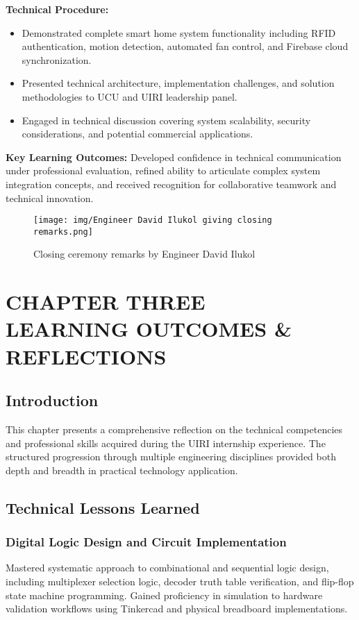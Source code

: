 \documentclass[12pt,a4paper]{report}
\begin{document}
\noindent\textbf{Technical Procedure:}
\begin{itemize}
    \item Demonstrated complete smart home system functionality including RFID authentication, motion detection, automated fan control, and Firebase cloud synchronization.
    \item Presented technical architecture, implementation challenges, and solution methodologies to UCU and UIRI leadership panel.
    \item Engaged in technical discussion covering system scalability, security considerations, and potential commercial applications.
\end{itemize}

\noindent\textbf{Key Learning Outcomes:} Developed confidence in technical communication under professional evaluation, refined ability to articulate complex system integration concepts, and received recognition for collaborative teamwork and technical innovation.

\begin{figure}[H]
\centering
\texttt{[image: img/Engineer David Ilukol giving closing remarks.png]}
\caption{Closing ceremony remarks by Engineer David Ilukol}
\label{fig:closing-remarks}
\end{figure}

\newpage
\chapter[CHAPTER THREE LEARNING OUTCOMES AND REFLECTIONS]{CHAPTER THREE \\LEARNING OUTCOMES \& REFLECTIONS}

\section{Introduction}

\noindent This chapter presents a comprehensive reflection on the technical competencies and professional skills acquired during the UIRI internship experience. The structured progression through multiple engineering disciplines provided both depth and breadth in practical technology application.

\section{Technical Lessons Learned}

\subsection{Digital Logic Design and Circuit Implementation}
\noindent Mastered systematic approach to combinational and sequential logic design, including multiplexer selection logic, decoder truth table verification, and flip-flop state machine programming. Gained proficiency in simulation to hardware validation workflows using Tinkercad and physical breadboard implementations.
\end{document}
